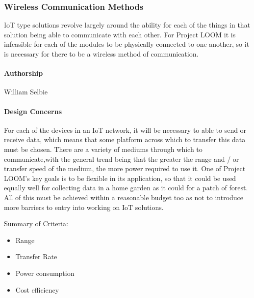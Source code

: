 \documentclass[onecolumn, draftclsnofoot,10pt, compsoc]{IEEEtran}
\begin{document}
\subsubsection{Wireless Communication Methods}
    IoT type solutions revolve largely around the ability for each of the things in that solution being able to communicate with each other. For Project LOOM it is infeasible for each of the modules to be physically connected to one another, so it is necessary for there to be a wireless method of communication. 

\paragraph{Authorship}
    William Selbie

\paragraph{Design Concerns}
    For each of the devices in an IoT network, it will be necessary to able to send or receive data, which means that some platform across which to transfer this data must be chosen. There are a variety of mediums through which to communicate,with the general trend being that the greater the range and / or transfer speed of the medium, the more power required to use it. One of Project LOOM's key goals is to be flexible in its application, so that it could be used equally well for collecting data in a home garden as it could for a patch of forest. All of this must be achieved within a reasonable budget too as not to introduce more barriers to entry into working on IoT solutions. 

    Summary of Criteria:
    \begin{itemize}[noitemsep,topsep=-10pt]
        \item Range
        \item Transfer Rate
        \item Power consumption
        \item Cost efficiency
    \end{itemize}
\end{document}
